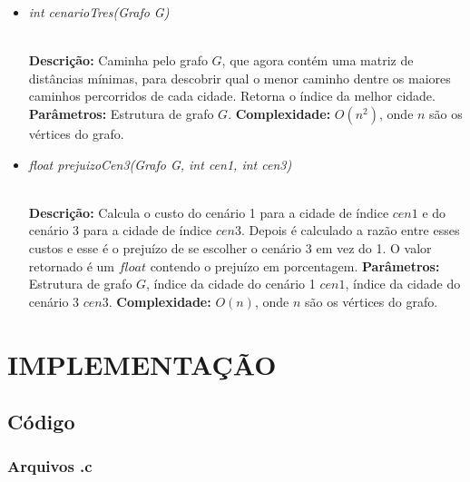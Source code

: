 \documentclass[12pt]{article}
\begin{document}
\vspace{0.2 true cm}

\begin{itemize}
 \item \begin{large}\textit{int cenarioTres(Grafo G)}\end{large}\\
 \subitem \textbf{Descrição:} Caminha pelo grafo $G$, que agora contém uma matriz de distâncias mínimas, para descobrir qual o menor caminho dentre os maiores caminhos percorridos de cada cidade. Retorna o índice da melhor cidade.
 \subitem \textbf{Parâmetros:} Estrutura de grafo $G$.
 \subitem \textbf{Complexidade:} $O(n^2)$, onde $n$ são os vértices do grafo.
\end{itemize}

\vspace{0.2 true cm}

\begin{itemize}
 \item \begin{large}\textit{float prejuizoCen3(Grafo G, int cen1, int cen3)}\end{large}\\
 \subitem \textbf{Descrição:} Calcula o custo do cenário 1 para a cidade de índice $cen1$ e do cenário 3 para a cidade de índice $cen3$. Depois é calculado a razão entre esses custos e esse é o prejuízo de se escolher o cenário 3 em vez do 1. O valor retornado é um $float$ contendo o prejuízo em porcentagem.
 \subitem \textbf{Parâmetros:} Estrutura de grafo $G$, índice da cidade do cenário 1 $cen1$, índice da cidade do cenário 3 $cen3$.
 \subitem \textbf{Complexidade:} $O(n)$, onde $n$ são os vértices do grafo.
\end{itemize}


\section{IMPLEMENTAÇÃO}
\label{implementacao}

\subsection{Código}

\subsubsection{Arquivos .c}
\end{document}
